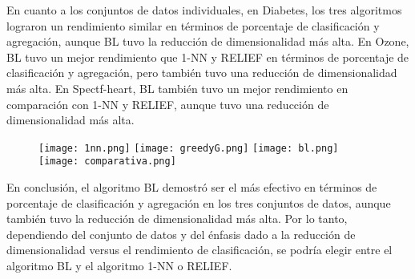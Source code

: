 En cuanto a los conjuntos de datos individuales, en Diabetes, los tres algoritmos lograron un rendimiento similar en términos de porcentaje de clasificación y agregación, aunque BL tuvo la reducción de dimensionalidad más alta. En Ozone, BL tuvo un mejor rendimiento que 1-NN y RELIEF en términos de porcentaje de clasificación y agregación, pero también tuvo una reducción de dimensionalidad más alta. En Spectf-heart, BL también tuvo un mejor rendimiento en comparación con 1-NN y RELIEF, aunque tuvo una reducción de dimensionalidad más alta.\\

\begin{figure}[H]
	\centering
	\texttt{[image: 1nn.png]}
	\texttt{[image: greedyG.png]}
	\texttt{[image: bl.png]}
	\texttt{[image: comparativa.png]}
\end{figure}

En conclusión, el algoritmo BL demostró ser el más efectivo en términos de porcentaje de clasificación y agregación en los tres conjuntos de datos, aunque también tuvo la reducción de dimensionalidad más alta. Por lo tanto, dependiendo del conjunto de datos y del énfasis dado a la reducción de dimensionalidad versus el rendimiento de clasificación, se podría elegir entre el algoritmo BL y el algoritmo 1-NN o RELIEF.



